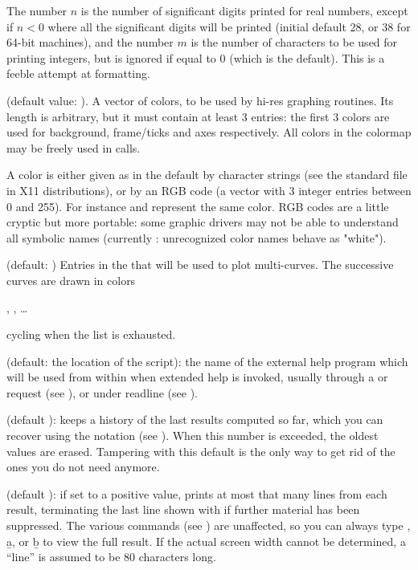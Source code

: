 The number $n$ is the number of significant digits printed for real
numbers, except if $n<0$ where all the significant digits will be printed
(initial default 28, or 38 for 64-bit machines), and the number $m$ is the
number of characters to be used for printing integers, but is ignored if
equal to 0 (which is the default). This is a feeble attempt at formatting.

 (default value: ). A vector of colors, to be
used by hi-res graphing routines. Its length is arbitrary, but it must
contain at least 3 entries: the first 3 colors are used for background,
frame/ticks and axes respectively. All colors in the colormap may be freely
used in  calls.

A color is either given as in the default by character strings (see
the standard  file in X11 distributions), or by an RGB code (a
vector with 3 integer entries between 0 and 255). For instance \kbd{[250,
235, 215]} and  represent the same color. RGB codes are
a little cryptic but more portable: some graphic drivers may not be able to
understand all symbolic names (currently : unrecognized color names
behave as "white").

 (default: \kbd{[4,5]}) Entries in the
 that will be used to plot multi-curves. The successive
curves are drawn in colors

  , ,
  \dots

cycling when the  list is exhausted.

 (default: the location of the  script): the
name of the external help program which will be used from within  when
extended help is invoked, usually through a  or  request
(see ), or  under readline (see
).

 (default ):  keeps a history of the last
 results computed so far, which you can recover using the
\kbd{\%} notation (see ). When this number is exceeded,
the oldest values are erased. Tampering with this default is the only way to
get rid of the ones you do not need anymore.

 (default ): if set to a positive value,  prints at
most that many lines from each result, terminating the last line shown with
\kbd{[+++]} if further material has been suppressed. The various 
commands (see ) are unaffected, so you can always type
, \b{a}, or \b{b} to view the full result. If the actual
screen width cannot be determined, a ``line'' is assumed to be 80 characters
long.

